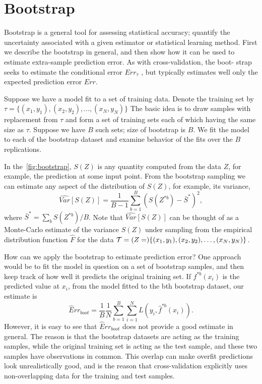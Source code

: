 \section{Bootstrap}
Bootstrap is a general tool for assessing statistical accuracy;
quantify the uncertainty associated with a given estimator or statistical learning method.
First we describe the bootstrap in general, and then show how it 
can be used to estimate extra-sample prediction error. 
As with cross-validation, the boot- strap seeks to estimate 
the conditional error $Err_\tau$ , but typically estimates well 
only the expected prediction error $Err$.


Suppose we have a model fit to a set of training data.
Denote the training set by $\tau = \{(x_1, y_1), (x_2, y_2), \dots, (x_N, y_N)\}$
The basic idea is to draw samples with replacement from $\tau$ and
form a set of training sets each of which having the same size as $\tau$.
Suppose we have $B$ such sets; size of bootstrap is $B$.
We fit the model to each of the bootstrap dataset and
examine behavior of the fits over the $B$ replications.

In the~\cref{fig:bootstrap}, $S(Z)$ is any quantity computed 
from the data $Z$, for example, the prediction at some input point. 
From the bootstrap sampling we can estimate any 
aspect of the distribution of $S(Z)$, for example, its variance,
\begin{equation}
\label{eq:bootVariance}
\widehat{Var}[S(Z)] = \frac{1}{B-1} \sum_{b=1}^B (S(Z^{*b}) - \bar S^*)^2,
\end{equation}
where $\bar S^* = \sum_b S(Z^{*b})/B$. Note that $\widehat{Var}[S(Z)]$ 
can be thought of as a Monte-Carlo estimate of the variance $S(Z)$
under sampling from the empirical distribution function $\hat F$ for the
data $\mathcal{T} = (Z =) \{(x_1, y_1), (x_2, y_2), \dots, (x_N, y_N) \}$.

How can we apply the bootstrap to estimate prediction error? 
One approach would be to fit the model in question on a 
set of bootstrap samples, and then keep track of how well 
it predicts the original training set. If $f^{*b}(x_i)$ is the predicted 
value at $x_i$, from the model fitted to the bth bootstrap dataset, 
our estimate is
\begin{equation}
\widehat Err_{boot} = \frac{1}{B} \frac{1}{N} \sum_{b=1}^B \sum_{i=1}^N
L(y_i, \hat f^{*b}(x_i)).
\end{equation}
However, it is easy to see that $\widehat Err_{boot}$ does not provide a 
good estimate in general. The reason is that the bootstrap 
datasets are acting as the training samples, while the
original training set is acting as the test sample, and these 
two samples have observations in common. This overlap 
can make overfit predictions look unrealistically good, 
and is the reason that cross-validation explicitly uses 
non-overlapping data for the training and test samples.


